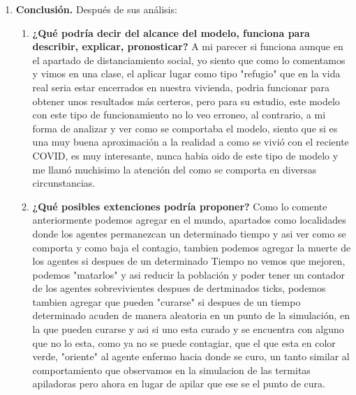 \documentclass[12pt]{article}
\begin{document}
\begin{enumerate}
    \item \textbf{Conclusión.} Después de sus análisis: 
    \begin{enumerate}
        \item \textbf{¿Qué podría decir del alcance del modelo, funciona para describir, explicar, pronosticar?}
        A mi parecer si funciona aunque en el apartado de distanciamiento social, yo siento que como lo comentamos y vimos en una clase, el aplicar lugar como tipo "refugio" que en la vida real seria estar encerrados en nuestra vivienda, 
        podria funcionar para obtener unos resultados más certeros, pero para su estudio, este modelo con este tipo de funcionamiento no lo veo erroneo, al contrario, a mi forma de analizar y ver como se comportaba el modelo, siento que si es una muy
        buena  aproximación a la realidad a como se vivió con el reciente COVID, es muy interesante, nunca habia oido de este tipo de modelo y me llamó muchisimo la atención del como se comporta en diversas circunstancias.
        \item \textbf{¿Qué posibles extenciones podría proponer?}
        Como lo comente anteriormente podemos agregar en el mundo, apartados como localidades donde los agentes permanezcan un determinado tiempo y asi ver como se comporta y como baja el contagio, tambien podemos agregar la muerte de los agentes si despues de un determinado Tiempo
        no vemos que mejoren, podemos "matarlos" y asi reducir la población y poder tener un contador de los agentes sobrevivientes despues de dertminados ticks, podemos tambien agregar que pueden "curarse" si despues de un tiempo determinado acuden de manera aleatoria en un punto de la simulación, 
        en la que pueden curarse y asi si uno esta curado y se encuentra con alguno que no lo esta, como ya no se puede contagiar, que el que esta en color verde, "oriente" al agente enfermo hacia donde se curo,
        un tanto similar al comportamiento que observamos en la simulacion de las termitas apiladoras pero ahora en lugar de apilar que ese se el punto de cura.
    \end{enumerate}

\end{enumerate}
\end{document}
